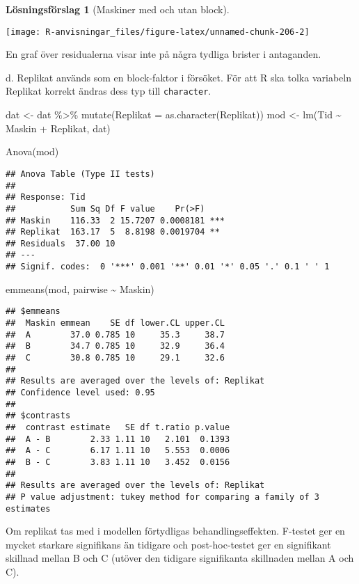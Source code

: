 \documentclass[
]{book}
\newenvironment{Shaded}{\begin{snugshade}}{\end{snugshade}}
\newcommand{\AttributeTok}[1]{\textcolor[rgb]{0.77,0.63,0.00}{#1}}
\newcommand{\FunctionTok}[1]{\textcolor[rgb]{0.00,0.00,0.00}{#1}}
\newcommand{\NormalTok}[1]{#1}
\newcommand{\OtherTok}[1]{\textcolor[rgb]{0.56,0.35,0.01}{#1}}
\newcommand{\SpecialCharTok}[1]{\textcolor[rgb]{0.00,0.00,0.00}{#1}}
\theoremstyle{definition}
\theoremstyle{definition}
\theoremstyle{definition}
\theoremstyle{definition}
\newtheorem{hypothesis}{Lösningsförslag}[chapter]
\theoremstyle{remark}
\begin{document}
\begin{hypothesis}[Maskiner med och utan block]
\begin{center}\texttt{[image: R-anvisningar\_files/figure-latex/unnamed-chunk-206-2]} \end{center}

En graf över residualerna visar inte på några tydliga brister i antaganden.

d. Replikat används som en block-faktor i försöket. För att R ska tolka variabeln Replikat korrekt ändras dess typ till \texttt{character}.

\begin{Shaded}
\begin{Highlighting}[]
\NormalTok{dat }\OtherTok{\textless{}{-}}\NormalTok{ dat }\SpecialCharTok{\%\textgreater{}\%} \FunctionTok{mutate}\NormalTok{(}\AttributeTok{Replikat =} \FunctionTok{as.character}\NormalTok{(Replikat))}
\NormalTok{mod }\OtherTok{\textless{}{-}} \FunctionTok{lm}\NormalTok{(Tid }\SpecialCharTok{\textasciitilde{}}\NormalTok{ Maskin }\SpecialCharTok{+}\NormalTok{ Replikat, dat)}

\FunctionTok{Anova}\NormalTok{(mod)}
\end{Highlighting}
\end{Shaded}

\begin{verbatim}
## Anova Table (Type II tests)
## 
## Response: Tid
##           Sum Sq Df F value    Pr(>F)    
## Maskin    116.33  2 15.7207 0.0008181 ***
## Replikat  163.17  5  8.8198 0.0019704 ** 
## Residuals  37.00 10                      
## ---
## Signif. codes:  0 '***' 0.001 '**' 0.01 '*' 0.05 '.' 0.1 ' ' 1
\end{verbatim}

\begin{Shaded}
\begin{Highlighting}[]
\FunctionTok{emmeans}\NormalTok{(mod, pairwise }\SpecialCharTok{\textasciitilde{}}\NormalTok{ Maskin)}
\end{Highlighting}
\end{Shaded}

\begin{verbatim}
## $emmeans
##  Maskin emmean    SE df lower.CL upper.CL
##  A        37.0 0.785 10     35.3     38.7
##  B        34.7 0.785 10     32.9     36.4
##  C        30.8 0.785 10     29.1     32.6
## 
## Results are averaged over the levels of: Replikat 
## Confidence level used: 0.95 
## 
## $contrasts
##  contrast estimate   SE df t.ratio p.value
##  A - B        2.33 1.11 10   2.101  0.1393
##  A - C        6.17 1.11 10   5.553  0.0006
##  B - C        3.83 1.11 10   3.452  0.0156
## 
## Results are averaged over the levels of: Replikat 
## P value adjustment: tukey method for comparing a family of 3 estimates
\end{verbatim}

Om replikat tas med i modellen förtydligas behandlingseffekten. F-testet ger en mycket starkare signifikans än tidigare och post-hoc-testet ger en signifikant skillnad mellan B och C (utöver den tidigare signifikanta skillnaden mellan A och C).
\end{hypothesis}
\end{document}
